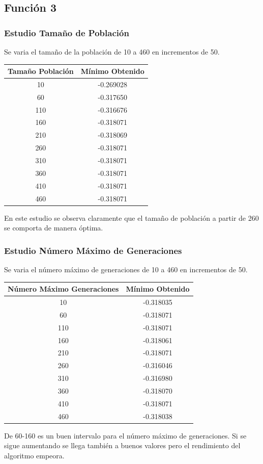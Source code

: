 \documentclass[12pt]{article}
\begin{document}
\subsection{Función 3}
\subsubsection*{Estudio Tamaño de Población}
	Se varia el tamaño de la población de 10 a 460 en incrementos de 50.
\begin{table}[H]
\begin{center}
\begin{tabular}{|cc|} \hline
Tamaño Población & Mínimo Obtenido \\  \hline
10  & -0.269028 \\ 
60  & -0.317650 \\ 
110 & -0.316676 \\
160 & -0.318071 \\
210 & -0.318069 \\
260 & -0.318071 \\
310 & -0.318071 \\
360 & -0.318071 \\ 
410 & -0.318071 \\
460 & -0.318071 \\  \hline
\end{tabular}
\end{center}
\end{table}
	En este estudio se observa claramente que el tamaño de población a partir de 260 se comporta de manera óptima. 

\subsubsection*{Estudio Número Máximo de Generaciones}
	Se varia el número máximo de generaciones de 10 a 460 en incrementos de 50.
\begin{table}[H]
\begin{center}
\begin{tabular}{|cc|} \hline
Número Máximo Generaciones & Mínimo Obtenido \\  \hline
10  & -0.318035 \\ 
60  & -0.318071 \\ 
110 & -0.318071 \\
160 & -0.318061 \\
210 & -0.318071 \\
260 & -0.316046 \\
310 & -0.316980 \\
360 & -0.318070 \\ 
410 & -0.318071 \\
460 & -0.318038 \\  \hline
\end{tabular}
\end{center}
\end{table}
	De 60-160 es un buen intervalo para el número máximo de generaciones. Si se sigue aumentando se llega también a buenos valores pero el rendimiento del algoritmo empeora.
\end{document}
